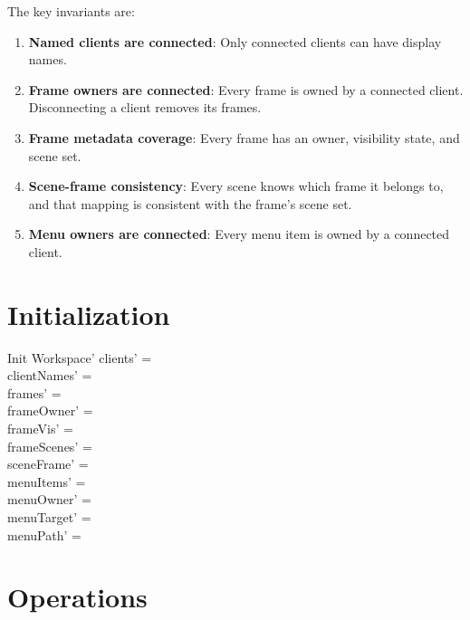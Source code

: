 \documentclass[a4paper,10pt,fleqn]{article}
\begin{document}
The key invariants are:
\begin{enumerate}
  \item \textbf{Named clients are connected}: Only connected
    clients can have display names.
  \item \textbf{Frame owners are connected}: Every frame is owned
    by a connected client.  Disconnecting a client removes its frames.
  \item \textbf{Frame metadata coverage}: Every frame has an owner,
    visibility state, and scene set.
  \item \textbf{Scene-frame consistency}: Every scene knows which
    frame it belongs to, and that mapping is consistent with the
    frame's scene set.
  \item \textbf{Menu owners are connected}: Every menu item is
    owned by a connected client.
\end{enumerate}

\section{Initialization}

\begin{schema}{Init}
  Workspace'
  \where
  clients' = \emptyset \\
  clientNames' = \emptyset \\
  frames' = \emptyset \\
  frameOwner' = \emptyset \\
  frameVis' = \emptyset \\
  frameScenes' = \emptyset \\
  sceneFrame' = \emptyset \\
  menuItems' = \emptyset \\
  menuOwner' = \emptyset \\
  menuTarget' = \emptyset \\
  menuPath' = \emptyset
\end{schema}

\section{Operations}

\end{document}
